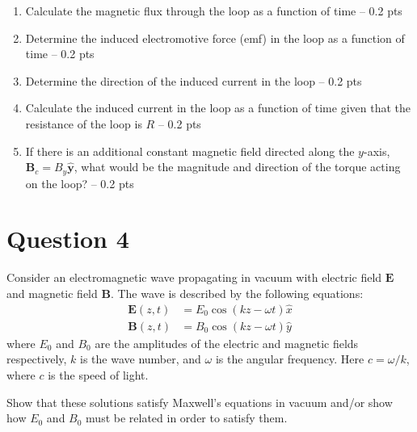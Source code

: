 \documentclass[12pt]{article}
\begin{document}
\begin{enumerate}
\item[(a)] Calculate the magnetic flux through the loop as a function of time -- 0.2 pts

\item[(b)] Determine the induced electromotive force (emf) in the loop as a function of time -- 0.2 pts

\item[(c)] Determine the direction of the induced current in the loop -- 0.2 pts

\item[(d)] Calculate the induced current in the loop as a function of time given that the resistance of the loop is $R$ -- 0.2 pts

\item[(e)] If there is an additional constant magnetic field directed along the $y$-axis, $\mathbf{B}_c=B_y\hat{\mathbf{y}}$, what would be the magnitude and direction of the torque acting on the loop? -- 0.2 pts
\end{enumerate}

\section*{Question 4}

Consider an electromagnetic wave propagating in vacuum with electric field $\mathbf{E}$ and magnetic field $\mathbf{B}$. The wave is described by the following equations:
\begin{equation*}
\begin{split}
    \mathbf{E}(z,t)&=E_0\cos(kz-\omega t)\hat{x} \\
    \mathbf{B}(z,t)&=B_0\cos(kz-\omega t)\hat{y}
\end{split}
\end{equation*}
where $E_0$ and $B_0$ are the amplitudes of the electric and magnetic fields respectively, $k$ is the wave number, and $\omega$ is the angular frequency. Here $c=\omega/k$, where $c$ is the speed of light.

Show that these solutions satisfy Maxwell's equations in vacuum and/or show how $E_0$ and $B_0$ must be related in order to satisfy them.
\end{document}
